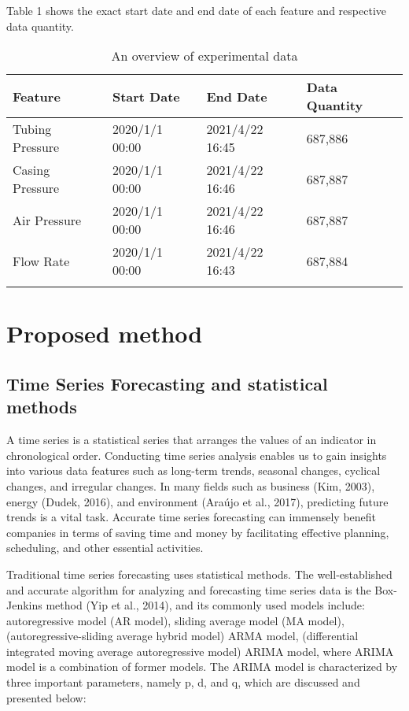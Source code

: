 \documentclass[sn-mathphys,Numbered]{sn-jnl}%
\theoremstyle{thmstyleone}%
\theoremstyle{thmstyletwo}%
\theoremstyle{thmstylethree}%
\begin{document}
Table 1 shows the exact start date and end date of each feature and respective data quantity.

\begin{table}[h]
\caption{An overview of experimental data}\label{tab1}%
\begin{tabular}{@{}llll@{}}
\toprule
Feature & Start Date  & End Date & Data Quantity\\
\midrule
Tubing Pressure    & 2020/1/1 00:00   & 2021/4/22 16:45  & 687,886  \\
Casing Pressure    & 2020/1/1 00:00   & 2021/4/22 16:46  & 687,887  \\
Air Pressure    & 2020/1/1 00:00   & 2021/4/22 16:46  & 687,887  \\
Flow Rate    & 2020/1/1 00:00   & 2021/4/22 16:43  & 687,884  \\
\botrule
\end{tabular}
\end{table}

\section{Proposed method}\label{sec3}

\subsection{Time Series Forecasting and statistical methods}\label{subsec3}

A time series is a statistical series that arranges the values of an indicator in chronological order. Conducting time series analysis enables us to gain insights into various data features such as long-term trends, seasonal changes, cyclical changes, and irregular changes. In many fields such as business (Kim, 2003), energy (Dudek, 2016), and environment (Araújo et al., 2017), predicting future trends is a vital task. Accurate time series forecasting can immensely benefit companies in terms of saving time and money by facilitating effective planning, scheduling, and other essential activities.

Traditional time series forecasting uses statistical methods. The well-established and accurate algorithm for analyzing and forecasting time series data is the Box-Jenkins method (Yip et al., 2014), and its commonly used models include: autoregressive model (AR model), sliding average model (MA model), (autoregressive-sliding average hybrid model) ARMA model, (differential integrated moving average autoregressive model) ARIMA model, where ARIMA model is a combination of former models. The ARIMA model is characterized by three important parameters, namely p, d, and q, which are discussed and presented below:
\end{document}
